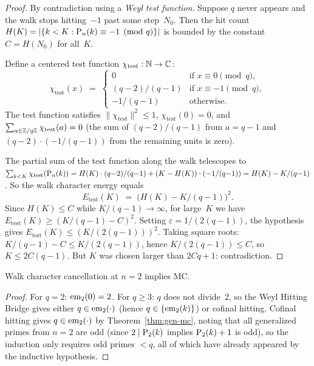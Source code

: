\begin{proof}
By contradiction using a \emph{Weyl test function}.  Suppose $q$ never
appears and the walk stops hitting~$-1$ past some step~$N_0$.  Then the
hit count $H(K) = |\{k < K : \mathrm{P}_{n}(k) \equiv -1 \pmod{q}\}|$ is
bounded by the constant $C = H(N_0)$ for all~$K$.

Define a centered test function $\chi_{\mathrm{test}} : \mathbb{N} \to \mathbb{C}$:
\[
  \chi_{\mathrm{test}}(x) \;=\;
  \begin{cases}
    0 & \text{if } x \equiv 0 \pmod{q}, \\
    (q{-}2)/(q{-}1) & \text{if } x \equiv -1 \pmod{q}, \\
    -1/(q{-}1) & \text{otherwise.}
  \end{cases}
\]
The test function satisfies $\|\chi_{\mathrm{test}}\|^2 \leq 1$,
$\chi_{\mathrm{test}}(0) = 0$, and
$\sum_{a \in \mathbb{Z}/q\mathbb{Z}} \chi_{\mathrm{test}}(a) = 0$ (the sum of
$(q{-}2)/(q{-}1)$ from $a = q{-}1$ and $(q{-}2) \cdot (-1/(q{-}1))$
from the remaining units is zero).

The partial sum of the test function along the walk telescopes to
$\sum_{k<K} \chi_{\mathrm{test}}(\mathrm{P}_{n}(k)) = H(K) \cdot
(q{-}2)/(q{-}1) + (K - H(K)) \cdot (-1/(q{-}1))
= H(K) - K/(q{-}1)$.
So the walk character energy equals
\[
  E_{\mathrm{test}}(K) \;=\; \bigl(H(K) - K/(q{-}1)\bigr)^2.
\]
Since $H(K) \leq C$ while $K/(q{-}1) \to \infty$, for large~$K$ we have
$E_{\mathrm{test}}(K) \geq (K/(q{-}1) - C)^2$.  Setting
$\varepsilon = 1/(2(q{-}1))$, the hypothesis gives
$E_{\mathrm{test}}(K) \leq (K/(2(q{-}1)))^2$.  Taking square roots:
$K/(q{-}1) - C \leq K/(2(q{-}1))$, hence $K/(2(q{-}1)) \leq C$,
so $K \leq 2C(q{-}1)$.  But $K$ was chosen larger than $2Cq + 1$:
contradiction.
\end{proof}

\begin{theorem}
\label{thm:cancel-weyl-mc}
Walk character cancellation at $n = 2$ implies MC.
\end{theorem}

\begin{proof}
For $q = 2$: $\mathrm{em}_{2}(0) = 2$.  For $q \geq 3$: $q$ does not divide~$2$,
so the Weyl Hitting Bridge gives either $q \in \mathrm{em}_{2}(\cdot)$
(hence $q \in \{\mathrm{em}_{2}(k)\}$) or cofinal hitting.  Cofinal hitting gives
$q \in \mathrm{em}_{2}(\cdot)$ by Theorem~\ref{thm:gen-mc}, noting
that all generalized primes from $n = 2$ are odd (since $2 \mid \mathrm{P}_{2}(k)$
implies $\mathrm{P}_{2}(k) + 1$ is odd), so the induction only requires
odd primes $< q$, all of which have already appeared by the
inductive hypothesis.
\end{proof}

